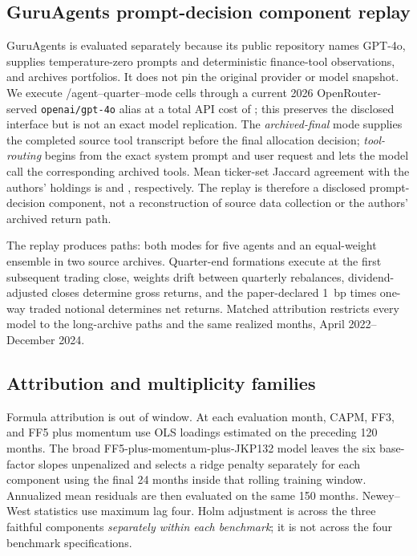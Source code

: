 \documentclass[sigconf,anonymous]{acmart}
\newcommand{\bps}[1]{#1~bp}
\begin{document}


\subsection{GuruAgents prompt-decision component replay}

GuruAgents is evaluated separately because its public repository names GPT-4o, supplies temperature-zero prompts and deterministic finance-tool observations, and archives portfolios. It does not pin the original provider or model snapshot. We execute \PromptReplaySuccessfulCount/\PromptReplayExperimentCount agent--quarter--mode cells through a current 2026 OpenRouter-served \texttt{openai/gpt-4o} alias at a total API cost of \PromptReplayCostUSD; this preserves the disclosed interface but is not an exact model replication. The \emph{archived-final} mode supplies the completed source tool transcript before the final allocation decision; \emph{tool-routing} begins from the exact system prompt and user request and lets the model call the corresponding archived tools. Mean ticker-set Jaccard agreement with the authors' holdings is \PromptReplayArchivedJaccard and \PromptReplayToolJaccard, respectively. The replay is therefore a disclosed prompt-decision component, not a reconstruction of source data collection or the authors' archived return path.

The replay produces \PromptReplayPathCount paths: both modes for five agents and an equal-weight ensemble in two source archives. Quarter-end formations execute at the first subsequent trading close, weights drift between quarterly rebalances, dividend-adjusted closes determine gross returns, and the paper-declared \bps{1} times one-way traded notional determines net returns. Matched attribution restricts every model to the \PromptReplayMatchedPathCount long-archive paths and the same \PromptReplayFactorMonthCount realized months, April 2022--December 2024.

\subsection{Attribution and multiplicity families}

Formula attribution is out of window. At each evaluation month, CAPM, FF3, and FF5 plus momentum use OLS loadings estimated on the preceding 120 months. The broad FF5-plus-momentum-plus-JKP132 model leaves the six base-factor slopes unpenalized and selects a ridge penalty separately for each component using the final 24 months inside that rolling training window. Annualized mean residuals are then evaluated on the same 150 months. Newey--West statistics use maximum lag four. Holm adjustment is across the three faithful components \emph{separately within each benchmark}; it is not across the four benchmark specifications.
\end{document}
